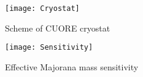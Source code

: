 \documentclass[12pt]{article}
\begin{document}


\begin{figure}[htb]
\centering
\begin{subfigure}{.5\textwidth}
  \centering
  \texttt{[image: Cryostat]}
  \caption{Scheme of CUORE cryostat}
  \label{fig:sub1}
\end{subfigure}%
\begin{subfigure}{.5\textwidth}
  \centering
  \texttt{[image: Sensitivity]}
  \caption{Effective Majorana mass sensitivity}
  \label{fig:sub2}
\end{subfigure}
\caption{}
\label{fig:test}
\end{figure}
\end{document}
